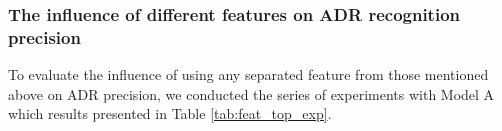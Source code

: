 \documentclass[a4paper,fleqn,longmktitle]{cas-dc}
\newcommand{\Fp}{F_1^\text{partial}}
\newcommand{\Fe}{F_1^\text{exact}}
\begin{document}
    
    
    \subsubsection{The influence of different features on ADR recognition precision} To evaluate the influence of using any separated feature from those mentioned above on ADR precision, we conducted the series of experiments with Model A which results presented in Table \ref{tab:feat_top_exp}.
\end{document}
